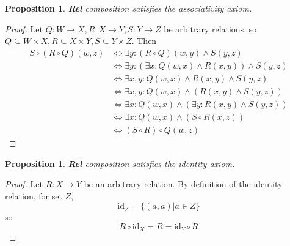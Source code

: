 \documentclass[11pt]{article} %
\newtheorem{proposition}[theorem]{Proposition}
\theoremstyle{definition}
\begin{document}
\begin{proposition}
    \textbf{Rel} composition satisfies the associativity axiom.
\end{proposition}
\begin{proof}
    Let $Q:W\rightarrow X, R:X\rightarrow Y, S: Y\rightarrow Z$ be arbitrary relations, 
    so $Q\subseteq W\times X, R\subseteq X \times Y, S\subseteq Y \times Z$.
    Then 
    \begin{equation}
    \begin{aligned}
        S\circ (R\circ Q)(w, z) &\iff \exists y: (R\circ Q)(w,y) \wedge S (y, z)\\
        &\iff \exists y: (\exists x: Q(w,x) \wedge R(x,y)) \wedge S(y,z)\\
        &\iff \exists x,y: Q(w,x) \wedge R(x,y) \wedge S(y,z)\\
        &\iff \exists x,y: Q(w,x) \wedge (R(x,y) \wedge S(y,z))\\
        &\iff \exists x: Q(w,x) \wedge (\exists y: R(x,y) \wedge S(y,z))\\
        &\iff \exists x: Q(w,x) \wedge (S\circ R(x, z))\\
        &\iff (S\circ R) \circ Q(w,z)
    \end{aligned}
    \end{equation}
\end{proof}
\begin{proposition}
    \textbf{Rel} composition satisfies the identity axiom.
\end{proposition}
\begin{proof}
    Let $R: X\rightarrow Y$ be an arbitrary relation. By definition of the identity relation, for set $Z$,
    \[\text{id}_Z = \{(a,a)|a\in Z\}\]
    so
    \[R\circ\text{id}_X=R=\text{id}_Y\circ R\]
\end{proof}
\end{document}
